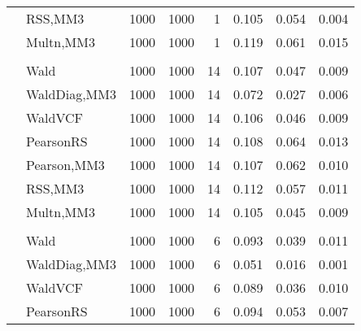 \documentclass[
]{article}
\begin{document}
\begin{table}[H]
{\begin{tabular}[t]{llrrrrrr}
\hspace{1em} & RSS,MM3 & 1000 & 1000 & 1 & 0.105 & 0.054 & 0.004\\

\hspace{1em} & Multn,MM3 & 1000 & 1000 & 1 & 0.119 & 0.061 & 0.015\\
\cmidrule{1-8}
\addlinespace[0.3em]
\multicolumn{8}{l}{\textbf{1F 15V}}\\
\hspace{1em} & Wald & 1000 & 1000 & 14 & 0.107 & 0.047 & 0.009\\

\hspace{1em} & WaldDiag,MM3 & 1000 & 1000 & 14 & 0.072 & 0.027 & 0.006\\

\hspace{1em} & WaldVCF & 1000 & 1000 & 14 & 0.106 & 0.046 & 0.009\\

\hspace{1em} & PearsonRS & 1000 & 1000 & 14 & 0.108 & 0.064 & 0.013\\

\hspace{1em} & Pearson,MM3 & 1000 & 1000 & 14 & 0.107 & 0.062 & 0.010\\

\hspace{1em} & RSS,MM3 & 1000 & 1000 & 14 & 0.112 & 0.057 & 0.011\\

\hspace{1em} & Multn,MM3 & 1000 & 1000 & 14 & 0.105 & 0.045 & 0.009\\
\cmidrule{1-8}
\addlinespace[0.3em]
\multicolumn{8}{l}{\textbf{2F 10V}}\\
\hspace{1em} & Wald & 1000 & 1000 & 6 & 0.093 & 0.039 & 0.011\\

\hspace{1em} & WaldDiag,MM3 & 1000 & 1000 & 6 & 0.051 & 0.016 & 0.001\\

\hspace{1em} & WaldVCF & 1000 & 1000 & 6 & 0.089 & 0.036 & 0.010\\

\hspace{1em} & PearsonRS & 1000 & 1000 & 6 & 0.094 & 0.053 & 0.007\\


\end{tabular}}
\end{table}
\end{document}
